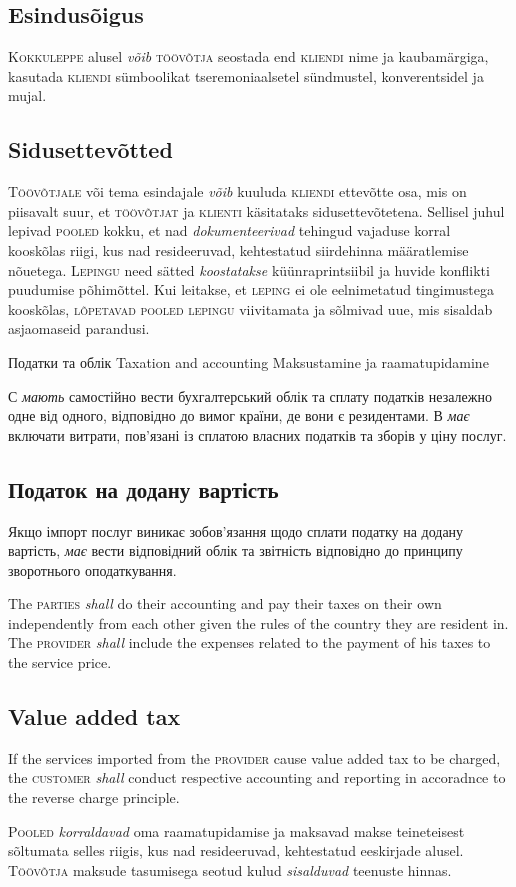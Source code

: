 \begin{Form}
\begin{paracol}{3}
{        \subsection{Esindusõigus}
        K\textsc{okkuleppe} alusel \emph{võib} \textsc{töövõtja} seostada end \textsc{kliendi} nime ja kaubamärgiga, kasutada \textsc{kliendi} sümboolikat tseremoniaalsetel sündmustel, konverentsidel ja mujal.

        \subsection{Sidusettevõtted}
        T\textsc{öövõtjale} või tema esindajale \emph{võib} kuuluda \textsc{kliendi} ettevõtte osa, mis on piisavalt suur, et \textsc{töövõtjat} ja \textsc{klienti} käsitataks sidusettevõtetena. Sellisel juhul lepivad \textsc{pooled} kokku, et nad \emph{dokumenteerivad} tehingud vajaduse korral kooskõlas riigi, kus nad resideeruvad, kehtestatud siirdehinna määratlemise nõuetega. L\textsc{epingu} need sätted \emph{koostatakse} küünraprintsiibil ja huvide konflikti puudumise põhimõttel. Kui leitakse, et \textsc{leping} ei ole eelnimetatud tingimustega kooskõlas, \textsc{lõpetavad pooled lepingu} viivitamata ja sõlmivad uue, mis sisaldab asjaomaseid parandusi.
        }
      \clause
        {Податки та облік}
        {Taxation and accounting}
        {Maksustamine ja raamatupidamine}
        {С \textit{мають} самостійно вести бухгалтерський облік та сплату податків незалежно одне від одного, відповідно до вимог країни, де вони є резидентами. В \textit{має} включати витрати, пов’язані із сплатою власних податків та зборів у ціну послуг.

        \subsection{Податок на додану вартість}
        Якщо імпорт послуг  виникає зобов'язання щодо сплати податку на додану вартість,  \textit{має} вести відповідний облік та звітність відповідно до принципу зворотнього оподаткування.
        }
        {The \textsc{parties} \textit{shall} do their accounting and pay their taxes on their own independently from each other given the rules of the country they are resident in. The \textsc{provider} \textit{shall} include the expenses related to the payment of his taxes to the service price.

        \subsection{Value added tax}
        If the services imported from the \textsc{provider} cause value added tax to be charged, the \textsc{customer} \textit{shall} conduct respective accounting and reporting in accoradnce to the reverse charge principle.
        }
        {P\textsc{ooled} \emph{korraldavad} oma raamatupidamise ja maksavad makse teineteisest sõltumata selles riigis, kus nad resideeruvad, kehtestatud eeskirjade alusel. T\textsc{öövõtja} maksude tasumisega seotud kulud \emph{sisalduvad} teenuste hinnas.

}
\end{paracol}
\end{Form}
